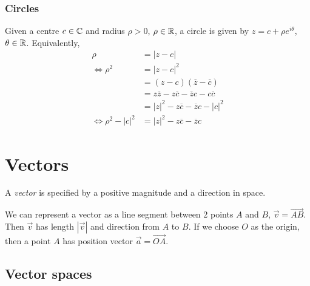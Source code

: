 \documentclass{../../template/note}
\begin{document}
    \subsubsection{Circles}

    Given a centre \(c \in \mathbb C\) and radius \(\rho > 0\), \(\rho \in \mathbb R\), a circle is given by \(z = c + \rho e^{i \theta}\), \(\theta \in \mathbb R\). Equivalently, 
    \begin{align*}
        \rho&=|z-c|\\
        \iff\rho^2&=|z-c|^2\\
        &= (z-c)(\overline{z}-\overline{c})\\
        &= z\overline{z}-z\overline{c}-\overline{z}c-c\overline{c} \\
        &= |z|^2-z\overline{c}-\overline{z}c-|c|^2\\
        \iff\rho^2-|c|^2&=|z|^2-z\overline{c}-\overline{z}c
    \end{align*}

    
    \section{Vectors}

    \begin{definition}
        A \emph{vector} is specified by a positive magnitude and a direction in space.

        We can represent a vector as a line segment between 2 points \(A\) and \(B\), \(\vec v = \overrightarrow{AB}\). Then \(\vec v\) has length \(|\vec v|\) and direction from \(A\) to \(B\). If we choose \(O\) as the origin, then a point \(A\) has position vector \(\vec a = \overrightarrow{OA}\).
    \end{definition}

    \subsection{Vector spaces}
    
\end{document}
